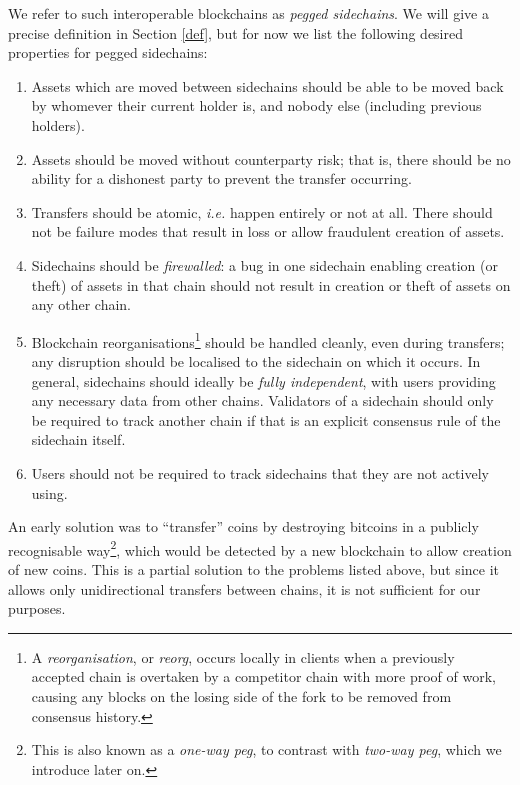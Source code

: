 \documentclass[letterpaper]{article}
\newcommand{\sidechain}{sidechain\xspace}
\newcommand{\sidechains}{sidechains\xspace}
\newcommand{\peggedsidechains}{pegged sidechains\xspace}
\begin{document}
We refer to such interoperable blockchains as \emph{\peggedsidechains}. We
will give a precise definition in Section \ref{def}, but for now we
list the following desired properties for \peggedsidechains:
\begin{enumerate}
\item Assets which are moved between sidechains should be
able to be moved back by whomever their current holder is, and nobody else (including
previous holders).

\item Assets should be moved without counterparty risk; that is, there should be no ability for a
dishonest party to prevent the transfer occurring.

\item Transfers should be atomic, \emph{i.e.} happen entirely or not at
all. There should not be failure modes that result in loss or allow fraudulent
creation of assets.

\item Sidechains should be \emph{firewalled}: a bug in one \sidechain enabling
creation (or theft) of assets in that chain should not result in creation or theft of assets
on any other chain.
\item Blockchain reorganisations\footnote{A \emph{reorganisation}, or \emph{reorg},
occurs locally in clients when a previously accepted chain is overtaken by a competitor
chain with more proof of work, causing any blocks on the losing side of the fork to be
removed from consensus history.} should be handled cleanly, even during transfers;
any disruption should be localised to the sidechain on which it occurs. In general,
\sidechains should ideally be \emph{fully independent}, with
users providing any necessary data from other chains. Validators of a \sidechain should only be required to track another chain if that is an explicit consensus rule of the \sidechain itself.

\item Users should not be required to track \sidechains that they are not
actively using.
\end{enumerate}

An early solution was to ``transfer'' coins by destroying bitcoins in a publicly
recognisable way\footnote{This is also known as a \emph{one-way peg}, to contrast
with \emph{two-way peg}, which we introduce later on.}, which would be detected by a new blockchain to allow creation
of new coins\cite{back2013-1}. This is a partial solution to the problems listed
above, but since it allows only unidirectional transfers between chains, it is not sufficient
for our purposes.
\end{document}
